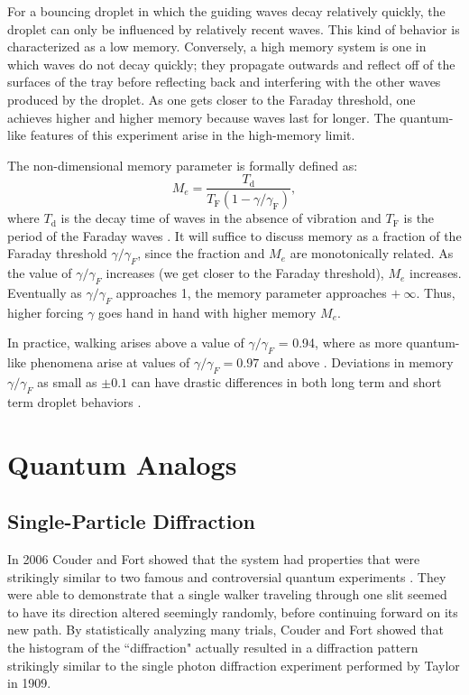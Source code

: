 For a bouncing droplet in which the guiding waves decay relatively quickly, the droplet can only be influenced by relatively recent waves. This kind of behavior is characterized as a low memory. Conversely, a high memory system is one in which waves do not decay quickly; they propagate outwards and reflect off of the surfaces of the tray before reflecting back and interfering with the other waves produced by the droplet. As one gets closer to the Faraday threshold, one achieves higher and higher memory because waves last for longer. The quantum-like features of this experiment arise in the high-memory limit. 

The non-dimensional memory parameter is formally defined as:
$$M_e = \frac{T_\mathrm{d}}{T_\mathrm{F}(1-\gamma/\gamma_\mathrm{F})},$$
where $T_\mathrm{d}$ is the decay time of waves in the absence of vibration and $T_\mathrm{F}$ is the period of the Faraday waves . It will suffice to discuss memory as a fraction of the Faraday threshold $\gamma/\gamma_{F}$, since the fraction and $M_e$ are monotonically related. As the value of $\gamma/\gamma_{F}$ increases (we get closer to the Faraday threshold), $M_e$ increases. Eventually as $\gamma/\gamma_{F}$ approaches 1, the memory parameter approaches $+~\infty$. Thus, higher forcing $\gamma$ goes hand in hand with higher memory $M_e$. 

In practice, walking arises above a value of $\gamma/\gamma_{F}$ = 0.94, where as more quantum-like phenomena arise at values of $\gamma/\gamma_{F} = 0.97$ and above . Deviations in memory $\gamma/\gamma_{F}$ as small as $\pm 0.1$ can have drastic differences in both long term and short term droplet behaviors .
            
            
\section{Quantum Analogs}   
             \subsection{Single-Particle Diffraction}
In 2006 Couder and Fort showed that the system had properties that were strikingly similar to two famous and controversial quantum experiments \cite{double-slit}. They were able to demonstrate that a single walker traveling through one slit seemed to have its direction altered seemingly randomly, before continuing forward on its new path. By statistically analyzing many trials, Couder and Fort showed that the histogram of the ``diffraction" actually resulted in a diffraction pattern strikingly similar to the single photon diffraction experiment performed by Taylor in 1909. 

